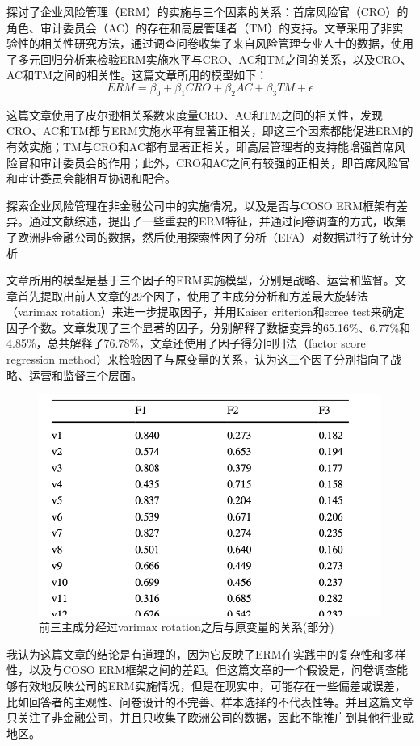 \documentclass[a4paper,12pt]{ctexart}
\begin{document}
\citet{mensah2015enterprise}探讨了企业风险管理（ERM）的实施与三个因素的关系：首席风险官（CRO）的角色、审计委员会（AC）的存在和高层管理者（TM）的支持。文章采用了非实验性的相关性研究方法，通过调查问卷收集了来自风险管理专业人士的数据，使用了多元回归分析来检验ERM实施水平与CRO、AC和TM之间的关系，以及CRO、AC和TM之间的相关性。这篇文章所用的模型如下：
$$ERM = \beta_0 + \beta_1 CRO + \beta_2 AC + \beta_3 TM + \epsilon$$

这篇文章使用了皮尔逊相关系数来度量CRO、AC和TM之间的相关性，发现CRO、AC和TM都与ERM实施水平有显著正相关，即这三个因素都能促进ERM的有效实施；TM与CRO和AC都有显著正相关，即高层管理者的支持能增强首席风险官和审计委员会的作用；此外，CRO和AC之间有较强的正相关，即首席风险官和审计委员会能相互协调和配合。

\citet{lackovic2022three}探索企业风险管理在非金融公司中的实施情况，以及是否与COSO ERM框架有差异。通过文献综述，提出了一些重要的ERM特征，并通过问卷调查的方式，收集了欧洲非金融公司的数据，然后使用探索性因子分析（EFA）对数据进行了统计分析

文章所用的模型是基于三个因子的ERM实施模型，分别是战略、运营和监督。文章首先提取出前人文章的29个因子，使用了主成分分析和方差最大旋转法（varimax rotation）来进一步提取因子，并用Kaiser criterion和scree test来确定因子个数。文章发现了三个显著的因子，分别解释了数据变异的65.16\%、6.77\%和4.85\%，总共解释了76.78\%，文章还使用了因子得分回归法（factor score regression method）来检验因子与原变量的关系，认为这三个因子分别指向了战略、运营和监督三个层面。
\begin{figure}[H]
    \caption{前三主成分经过varimax rotation之后与原变量的关系(部分)}
    \centering
    \includegraphics[width=0.6\linewidth]{img/pca.png}
\end{figure}

我认为这篇文章的结论是有道理的，因为它反映了ERM在实践中的复杂性和多样性，以及与COSO ERM框架之间的差距。但这篇文章的一个假设是，问卷调查能够有效地反映公司的ERM实施情况，但是在现实中，可能存在一些偏差或误差，比如回答者的主观性、问卷设计的不完善、样本选择的不代表性等。并且这篇文章只关注了非金融公司，并且只收集了欧洲公司的数据，因此不能推广到其他行业或地区。
\end{document}
